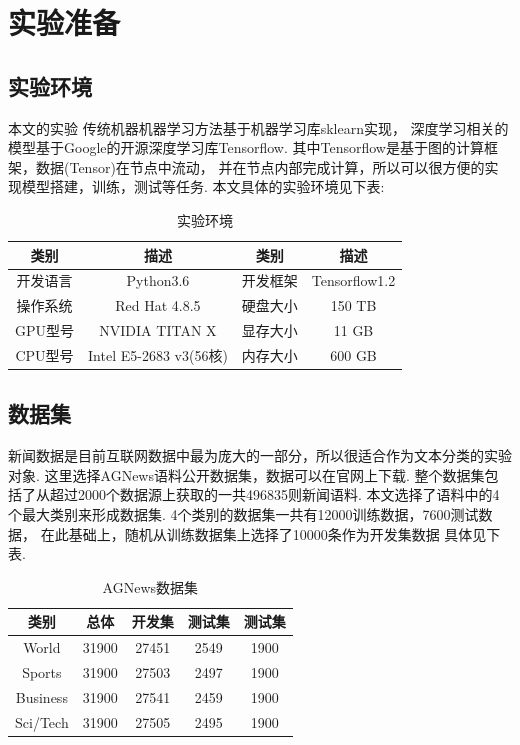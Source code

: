 \documentclass[bachelor,winfonts]{jnuthesis}
\begin{document}
\section{实验准备}
\subsection{实验环境}
本文的实验
传统机器机器学习方法基于机器学习库sklearn实现，
深度学习相关的模型基于Google的开源深度学习库Tensorflow.
其中Tensorflow是基于图的计算框架，数据(Tensor)在节点中流动，
并在节点内部完成计算，所以可以很方便的实现模型搭建，训练，测试等任务.
本文具体的实验环境见下表:

\begin{table}[h!]
  \centering
  \begin{tabular}{cccc}
    \toprule
    \textbf{类别} & \textbf{描述} & \textbf{类别} & \textbf{描述}\\
    \midrule
    开发语言 & Python3.6  & 开发框架 & Tensorflow1.2\\
    操作系统 & Red Hat 4.8.5 & 硬盘大小 & 150 TB \\
    GPU型号 & NVIDIA TITAN X & 显存大小 & 11 GB \\
    CPU型号 & Intel E5-2683 v3(56核) & 内存大小 & 600 GB\\
    \bottomrule
  \end{tabular}
  \caption{实验环境}
\end{table}

\subsection{数据集}
新闻数据是目前互联网数据中最为庞大的一部分，所以很适合作为文本分类的实验对象.
这里选择AGNews语料公开数据集，数据可以在官网上下载.
整个数据集包括了从超过2000个数据源上获取的一共496835则新闻语料.
本文选择了语料中的4个最大类别来形成数据集.
4个类别的数据集一共有12000训练数据，7600测试数据，
在此基础上，随机从训练数据集上选择了10000条作为开发集数据
具体见下表.

\begin{table}[h!]
  \centering
  \begin{tabular}{ccccc}
    \toprule
    \textbf{类别} & \textbf{总体} & \textbf{开发集} & \textbf{测试集} & \textbf{测试集} \\
    \midrule
    World & 31900 & 27451 & 2549 & 1900 \\
    Sports & 31900 & 27503 & 2497 & 1900 \\
    Business & 31900 & 27541 & 2459 & 1900 \\
    Sci/Tech & 31900 & 27505 & 2495 & 1900 \\
    \bottomrule
  \end{tabular}
  \caption{AGNews数据集}
\end{table}
\end{document}
